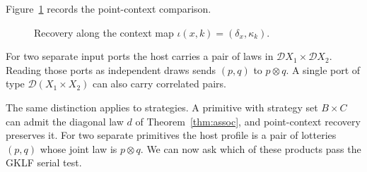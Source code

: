 \documentclass[11pt,a4paper]{article}
\theoremstyle{definition}
\newcommand{\D}{\mathcal D}
\newcommand{\Pow}{\mathcal P}
\begin{document}
Figure~\ref{fig:readback} records the point-context comparison.

\begin{figure}[!htbp]
    \centering
    \caption{Recovery along the context map $\iota(x,k)=(\delta_x,\kappa_k)$.}\label{fig:readback}
\end{figure}

For two separate input ports the host carries a pair of laws in $\D X_1\times\D X_2$. Reading those ports as independent draws sends $(p,q)$ to $p\otimes q$. A single port of type $\D(X_1\times X_2)$ can also carry correlated pairs.

The same distinction applies to strategies. A primitive with strategy set $B\times C$ can admit the diagonal law $d$ of Theorem~\ref{thm:assoc}, and point-context recovery preserves it. For two separate primitives the host profile is a pair of lotteries $(p,q)$ whose joint law is $p\otimes q$. We can now ask which of these products pass the GKLF serial test.
\end{document}
